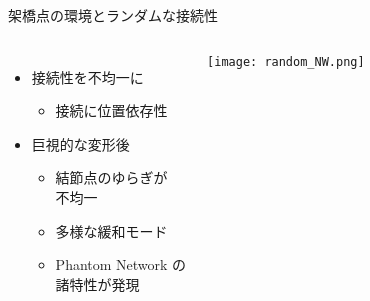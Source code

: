 \begin{columns}[totalwidth=.85\linewidth]
\begin{itembox}[l]{架橋点の環境とランダムな接続性\cite{flory}}
\begin{columns}[totalwidth=\textwidth]
					\begin{itemize}
						\item 接続性を不均一に
							\begin{itemize}
								\normalsize
							    \item 接続に\alert{位置依存性}
							\end{itemize}
						\item 巨視的な変形後
							\begin{itemize}
								\normalsize
								\item \alert{結節点のゆらぎが\\不均一}
								\item 多様な緩和モード
							\item \alert{Phantom Network の\\諸特性が発現}
							\end{itemize}
					\end{itemize}
					\centering
					\texttt{[image: random\_NW.png]}
			\end{columns}
		\end{itembox}
\end{columns}